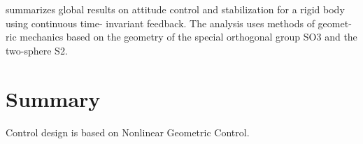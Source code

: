 \cite{Chaturvedi2011} summarizes global results on attitude control and stabilization for a rigid body using continuous time- invariant feedback. The analysis uses methods of geomet- ric mechanics based on the geometry of the special orthogonal group SO3 and the two-sphere S2.



\section*{Summary}

Control design is based on Nonlinear Geometric Control.





